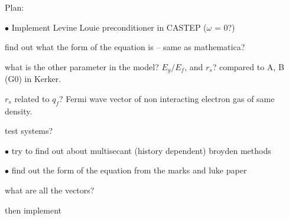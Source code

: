 Plan: 

$\bullet$ Implement Levine Louie preconditioner in CASTEP ($\omega$ = 0?)

find out what the form of the equation is -- same as mathematica?

what is the other parameter in the model? $E_g / E_f$, and $r_s$? compared to A, B (G0) in Kerker. 

$r_s$ related to $q_f$? Fermi wave vector of non interacting electron gas of same density. 

test systems?

$\bullet$ try to find out about multisecant (history dependent) broyden methods

$\bullet$ find out the form of the equation from the marks and luke paper

what are all the vectors?

then implement



